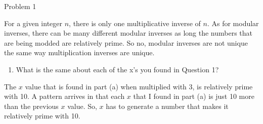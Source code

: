 \begin{problem}{Problem 1}
\begin{Highlight}
        For a given integer $n$, there is only one multiplicative inverse of $n$. As for modular inverses, there can be many different modular inverses as long the numbers that are being modded
        are relatively prime. So no, modular inverses are not unique the same way multiplication inverses are unique.
    \end{Highlight}

    \begin{Highlight}
        \begin{enumerate}[label = (\alph*), start = 3]
            \item What is the same about each of the x's you found in Question 1?
        \end{enumerate}

        The $x$ value that is found in part (a) when multiplied with 3, is relatively prime with 10. A pattern arrives in that each $x$ that I found in part (a) is just 10 more than the previous
        $x$ value. So, $x$ has to generate a number that makes it relatively prime with 10.
    \end{Highlight}
\end{problem}

